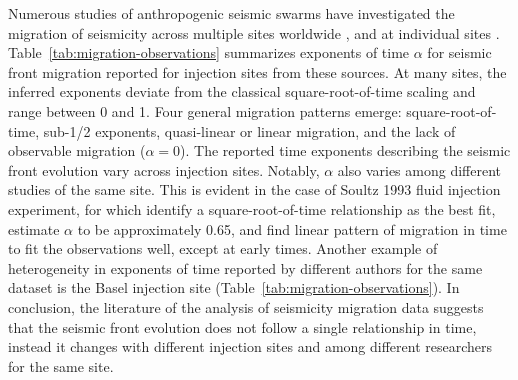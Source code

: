 \documentclass[draft]{agujournal2019}
\begin{document}
Numerous studies of anthropogenic seismic swarms have investigated the migration of seismicity across multiple sites worldwide \cite{GoebelBrodsky2018,DeBarrosEtAl2021}, and at individual sites \cite{ShapiroEtAl2002,LenglineEtAl2017,DanreEtAl2024}. Table~\ref{tab:migration-observations} summarizes exponents of time $\alpha$ for seismic front migration reported for injection sites from these sources. At many sites, the inferred exponents deviate from the classical square-root-of-time scaling and range between 0 and 1. Four general migration patterns emerge: square-root-of-time, sub-1/2 exponents, quasi-linear or linear migration, and the lack of observable migration ($\alpha=0$). The reported time exponents describing the seismic front evolution vary across injection sites. Notably, $\alpha$ also varies among different studies of the same site.  This is evident in the case of Soultz 1993 fluid injection experiment, for which  identify a square-root-of-time relationship as the best fit,  estimate $\alpha$ to be approximately 0.65, and  find linear pattern of migration in time to fit the observations well, except at early times. Another example of heterogeneity in exponents of time reported by different authors for the same dataset is the Basel injection site (Table~\ref{tab:migration-observations}). In conclusion, the literature of the analysis of seismicity migration data suggests that the seismic front evolution does not follow a single relationship in time, instead it changes with different injection sites and among different researchers for the same site.
\end{document}
